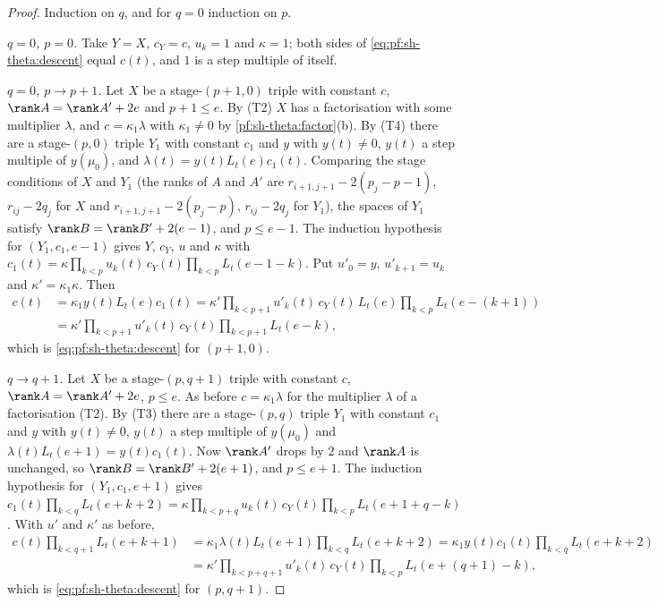 \begin{proof}
Induction on $q$, and for $q=0$ induction on $p$.

\emph{$q=0$, $p=0$.} Take $Y=X$, $c_Y=c$, $u_k=1$ and $\kappa=1$; both sides of \eqref{eq:pf:sh-theta:descent} equal $c(t)$,
and $1$ is a step multiple of itself.

\emph{$q=0$, $p\to p+1$.} Let $X$ be a stage-$(p+1,0)$ triple with constant $c$, $\rank A=\rank A'+2e$ and $p+1\le e$. By
(T2) $X$ has a factorisation with some multiplier $\lambda$, and $c=\kappa_1\lambda$ with $\kappa_1\ne0$ by
\cref{pf:sh-theta:factor}(b). By (T4) there are a stage-$(p,0)$ triple $Y_1$ with constant $c_1$ and $y$ with
$y(t)\ne0$, $y(t)$ a step multiple of $y(\mu_0)$, and $\lambda(t)=y(t)L_t(e)c_1(t)$. Comparing the stage conditions of $X$ and
$Y_1$ (the ranks of $A$ and $A'$ are $r_{i+1,j+1}-2(p_j-p-1)$, $r_{ij}-2q_j$ for $X$ and $r_{i+1,j+1}-2(p_j-p)$,
$r_{ij}-2q_j$ for $Y_1$), the spaces of $Y_1$ satisfy $\rank B=\rank B'+2(e-1)$, and $p\le e-1$. The induction hypothesis
for $(Y_1,c_1,e-1)$ gives $Y$, $c_Y$, $u$ and $\kappa$ with
$c_1(t)=\kappa\prod_{k<p}u_k(t)\,c_Y(t)\prod_{k<p}L_t(e-1-k)$. Put $u'_0=y$, $u'_{k+1}=u_k$ and $\kappa'=\kappa_1\kappa$.
Then
\begin{align*}
c(t)&=\kappa_1y(t)L_t(e)c_1(t)=\kappa'\prod_{k<p+1}u'_k(t)\,c_Y(t)\,L_t(e)\prod_{k<p}L_t(e-(k+1))\\
&=\kappa'\prod_{k<p+1}u'_k(t)\,c_Y(t)\prod_{k<p+1}L_t(e-k),
\end{align*}
which is \eqref{eq:pf:sh-theta:descent} for $(p+1,0)$.

\emph{$q\to q+1$.} Let $X$ be a stage-$(p,q+1)$ triple with constant $c$, $\rank A=\rank A'+2e$, $p\le e$. As before
$c=\kappa_1\lambda$ for the multiplier $\lambda$ of a factorisation (T2). By (T3) there are a stage-$(p,q)$ triple $Y_1$
with constant $c_1$ and $y$ with $y(t)\ne0$, $y(t)$ a step multiple of $y(\mu_0)$ and $\lambda(t)L_t(e+1)=y(t)c_1(t)$. Now
$\rank A'$ drops by $2$ and $\rank A$ is unchanged, so $\rank B=\rank B'+2(e+1)$, and $p\le e+1$. The induction hypothesis
for $(Y_1,c_1,e+1)$ gives
$c_1(t)\prod_{k<q}L_t(e+k+2)=\kappa\prod_{k<p+q}u_k(t)\,c_Y(t)\prod_{k<p}L_t(e+1+q-k)$. With $u'$ and $\kappa'$ as before,
\begin{align*}
c(t)\prod_{k<q+1}L_t(e+k+1)&=\kappa_1\lambda(t)L_t(e+1)\prod_{k<q}L_t(e+k+2)=\kappa_1y(t)c_1(t)\prod_{k<q}L_t(e+k+2)\\
&=\kappa'\prod_{k<p+q+1}u'_k(t)\,c_Y(t)\prod_{k<p}L_t(e+(q+1)-k),
\end{align*}
which is \eqref{eq:pf:sh-theta:descent} for $(p,q+1)$.
\end{proof}

